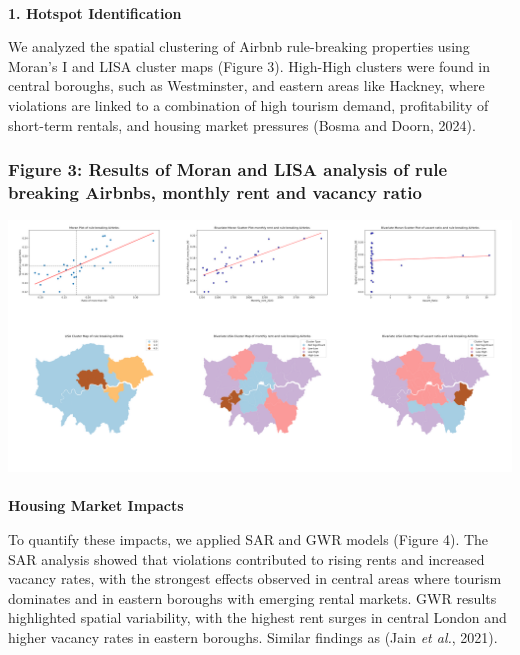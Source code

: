 \documentclass[
  a4paper,
  DIV=11,
  numbers=noendperiod]{scrartcl}
\makeatletter
\let\oldparagraph\paragraph
\renewcommand{\paragraph}{
    \@ifstar
      \xxxParagraphStar
      \xxxParagraphNoStar
  }
\newcommand{\xxxParagraphStar}[1]{\oldparagraph*{#1}\mbox{}}
\newcommand{\xxxParagraphNoStar}[1]{\oldparagraph{#1}\mbox{}}
\makeatother
\begin{document}
\paragraph{\texorpdfstring{\textbf{1. Hotspot
Identification}}{1. Hotspot Identification}}\label{hotspot-identification}

We analyzed the spatial clustering of Airbnb rule-breaking properties
using Moran's I and LISA cluster maps (Figure 3). High-High clusters
were found in central boroughs, such as Westminster, and eastern areas
like Hackney, where violations are linked to a combination of high
tourism demand, profitability of short-term rentals, and housing market
pressures (Bosma and Doorn, 2024).

\subsubsection{Figure 3: Results of Moran and LISA analysis of rule
breaking Airbnbs, monthly rent and vacancy
ratio}\label{figure-3-results-of-moran-and-lisa-analysis-of-rule-breaking-airbnbs-monthly-rent-and-vacancy-ratio}

\includegraphics{plots/combined_of_Moran_and_LISA.png}

\paragraph{\texorpdfstring{\textbf{Housing Market
Impacts}}{Housing Market Impacts}}\label{housing-market-impacts}

To quantify these impacts, we applied SAR and GWR models (Figure 4). The
SAR analysis showed that violations contributed to rising rents and
increased vacancy rates, with the strongest effects observed in central
areas where tourism dominates and in eastern boroughs with emerging
rental markets. GWR results highlighted spatial variability, with the
highest rent surges in central London and higher vacancy rates in
eastern boroughs. Similar findings as (Jain \emph{et al.}, 2021).
\end{document}
